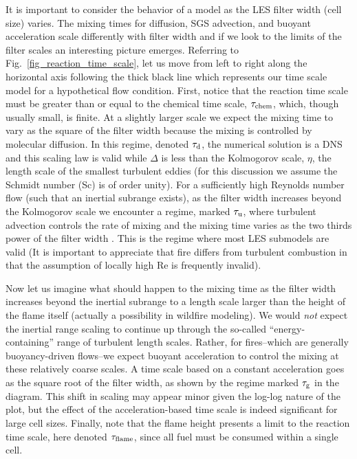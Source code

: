 It is important to consider the behavior of a model as the LES filter width (cell size) varies. The mixing times for diffusion, SGS advection, and buoyant acceleration scale differently with filter width and if we look to the limits of the filter scales an interesting picture emerges.  Referring to Fig.~\ref{fig_reaction_time_scale}, let us move from left to right along the horizontal axis following the thick black line which represents our time scale model for a hypothetical flow condition.  First, notice that the reaction time scale must be greater than or equal to the chemical time scale, $\tau_{\rm chem}$, which, though usually small, is finite. At a slightly larger scale we expect the mixing time to vary as the square of the filter width because the mixing is controlled by molecular diffusion.  In this regime, denoted $\tau_{\rm d}$, the numerical solution is a DNS and this scaling law is valid while $\Delta$ is less than the Kolmogorov scale, $\eta$, the length scale of the smallest turbulent eddies (for this discussion we assume the Schmidt number (Sc) is of order unity). For a sufficiently high Reynolds number flow (such that an inertial subrange exists), as the filter width increases beyond the Kolmogorov scale we encounter a regime, marked $\tau_{\rm u}$, where turbulent advection controls the rate of mixing and the mixing time varies as the two thirds power of the filter width \cite{Pope:2000}.  This is the regime where most LES submodels are valid (It is important to appreciate that fire differs from turbulent combustion in that the assumption of locally high Re is frequently invalid).

Now let us imagine what should happen to the mixing time as the filter width increases beyond the inertial subrange to a length scale larger than the height of the flame itself (actually a possibility in wildfire modeling). We would \emph{not} expect the inertial range scaling to continue up through the so-called ``energy-containing'' range of turbulent length scales.  Rather, for fires--which are generally buoyancy-driven flows--we expect buoyant acceleration to control the mixing at these relatively coarse scales.  A time scale based on a constant acceleration goes as the square root of the filter width, as shown by the regime marked $\tau_{\rm g}$ in the diagram.  This shift in scaling may appear minor given the log-log nature of the plot, but the effect of the acceleration-based time scale is indeed significant for large cell sizes.  Finally, note that the flame height presents a limit to the reaction time scale, here denoted $\tau_{\rm flame}$, since all fuel must be consumed within a single cell.

